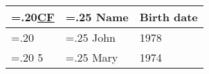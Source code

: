\documentclass[varwidth=6in]{standalone}
\providecommand\lightrule{%
	\arrayrulecolor{black!30}%
	\midrule[\lightrulewidth]%
	\arrayrulecolor{black}}
\begin{document}
\begin{tabularx}{\textwidth}{ >{\hsize=.20\hsize}X >{\hsize=.25\hsize}X X }
	\toprule
		\underline{CF} & Name & Birth date\\
	\midrule
		1 & John & 1978\\\lightrule
		5 & Mary & 1974\\
	\bottomrule
\end{tabularx}
\end{document}
